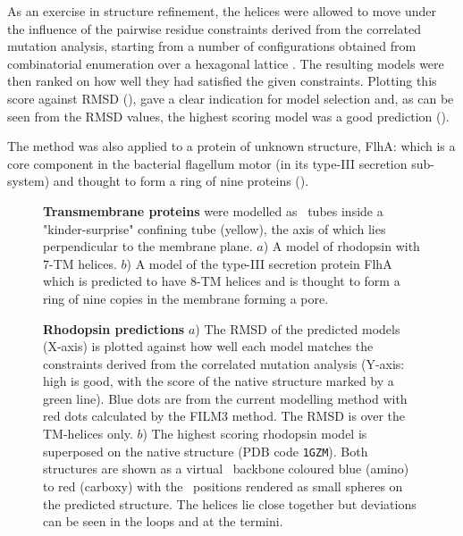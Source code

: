\documentclass[review]{elsarticle}
\begin{document}
{{{{{As an exercise in structure refinement, the helices were allowed to move
under the influence of the pairwise residue constraints derived from the
correlated mutation analysis, starting from a number of configurations
obtained from combinatorial enumeration over a hexagonal lattice \cite{TaylorWRet94a}.
The resulting models were then ranked on how well they had satisfied the
given constraints.  Plotting this score against RMSD (),
gave a clear indication for model selection and, as can be seen from the
RMSD values, the highest scoring model was a good prediction ().

The method was also applied to a protein of unknown structure, FlhA: which is
a core component in the bacterial flagellum motor (in its type-III secretion 
sub-system) and thought to form a ring of nine proteins ().

\begin{figure}
\centering
{}
\caption{
\label{Fig:TMmodels}
{\bf Transmembrane proteins} were modelled as \AH\ tubes inside a "kinder-surprise"
confining tube (yellow), the axis of which lies perpendicular to the membrane plane.
$a$) A model of rhodopsin with 7-TM helices.
$b$) A model of the type-III secretion protein FlhA which is predicted to have 8-TM helices
and is thought to form a ring of nine copies in the membrane forming a pore.
}
\end{figure}

\begin{figure}
\centering
{}
\caption{
\label{Fig:rhod-pred}
{\bf Rhodopsin predictions}
$a$) The RMSD of the predicted models (X-axis) is plotted against how well each model matches
the constraints derived from the correlated mutation analysis (Y-axis: high is good, with
the score of the native structure marked by a green line).
Blue dots are from the current modelling method with red dots calculated by the FILM3
method.  The RMSD is over the TM-helices only.
$b$) The highest scoring rhodopsin model is superposed on the native structure (PDB code {\tt 1GZM}).
Both structures are shown as a virtual \CA\ backbone coloured blue (amino) to red (carboxy)
with the \CA\ positions rendered as small spheres on the predicted structure.
The helices lie close together but deviations can be seen in the loops and at the termini.
}
\end{figure}


}}}}}
\end{document}
